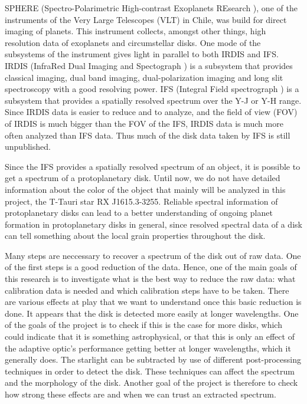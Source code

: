\documentclass[twoside,single,12pt]{lion-msc}
\begin{document}
SPHERE (Spectro-Polarimetric High-contrast Exoplanets REsearch \citep{Beuzit2008}), one of the instruments of the Very Large Telescopes (VLT) in Chile, was build for direct imaging of planets. This instrument collects, amongst other things, high resolution data of exoplanets and circumstellar disks. One mode of the subsystems of the instrument gives light in parallel to both IRDIS and IFS. IRDIS (InfraRed Dual Imaging and Spectograph \cite{Dohlen2008}) is a subsystem that provides classical imaging, dual band imaging, dual-polarization imaging and long slit spectroscopy with a good resolving power. IFS (Integral Field spectrograph \citep{Claudi2006}) is a subsystem that provides a spatially resolved spectrum over the Y-J or Y-H range. Since IRDIS data is easier to reduce and to analyze, and the field of view (FOV) of IRDIS is much bigger than the FOV of the IFS, IRDIS data is much more often analyzed than IFS data. Thus much of the disk data taken by IFS is still unpublished.
\bigskip

Since the IFS provides a spatially resolved spectrum of an object, it is possible to get a spectrum of a protoplanetary disk. Until now, we do not have detailed information about the color of the object that mainly will be analyzed in this project, the T-Tauri star RX J1615.3-3255. Reliable spectral information of protoplanetary disks can lead to a better understanding of ongoing planet formation in protoplanetary disks in general, since resolved spectral data of a disk can tell something about the local grain properties throughout the disk.
\bigskip

Many steps are neccessary to recover a spectrum of the disk out of raw data. One of the first steps is a good reduction of the data. Hence, one of the main goals of this research is to investigate what is the best way to reduce the raw data: what calibration data is needed and which calibration steps have to be taken. There are various effects at play that we want to understand once this basic reduction is done. It appears that the disk is detected more easily at longer wavelengths. One of the goals of the project is to check if this is the case for more disks, which could indicate that it is something astrophysical, or that this is only an effect of the adaptive optic's performance getting better at longer wavelengths, which it generally does. The starlight can be subtracted by use of different post-processing techniques in order to detect the disk. These techniques can affect the spectrum and the morphology of the disk. Another goal of the project is therefore to check how strong these effects are and when we can trust an extracted spectrum.
\bigskip
\end{document}
